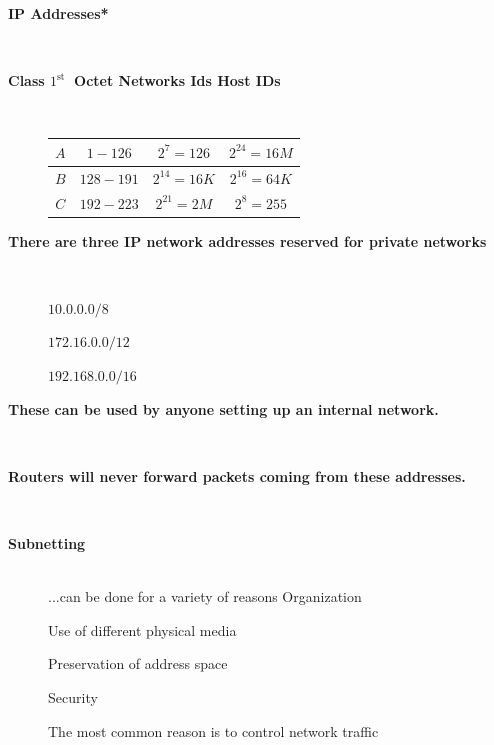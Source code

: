 \begin{description}
\os{\newpage}\item[{\rot\bf  IP Addresses* }]~\\[-3ex]


\os{\newpage}\item[{\rot\bf  Class $1^{\text {st }}$ Octet Networks Ids Host IDs }]~\\[-3ex]

\begin{center}
\begin{tabular}{|c|c|c|c|}
\hline
$A$ & $1-126$ & $2^{7}=126$ & $2^{24}=16 M$ \\
\hline
$B$ & $128-191$ & $2^{14}=16 K$ & $2^{16}=64 K$ \\
\hline
$C$ & $192-223$ & $2^{21}=2 M$ & $2^{8}=255$ \\
\hline
\end{tabular}
\end{center}


\os{\newpage}\item[{\rot\bf  There are three IP network addresses reserved for private networks }]~\\[-3ex]

\begin{enumerate}
  \ite $10.0 .0 .0 / 8$

  \ite $172.16 .0 .0 / 12$

  \ite $192.168 .0 .0 / 16$

\end{enumerate}


\os{\newpage}\item[{\rot\bf  These can be used by anyone setting up an internal network. }]~\\[-3ex]


\os{\newpage}\item[{\rot\bf  Routers will never forward packets coming from these addresses. }]~\\[-3ex]


\os{\newpage}\item[{\rot\bf  Subnetting }]~\\[-3ex]

...can be done for a variety of reasons
\bi
 \ite Organization
 \ei


\bi
  \ite Use of different physical media

  \ite Preservation of address space

\ei
\bi
 \ite Security
 \ei


\bi
  \ite The most common reason is to control network traffic
\ei



\end{description}
